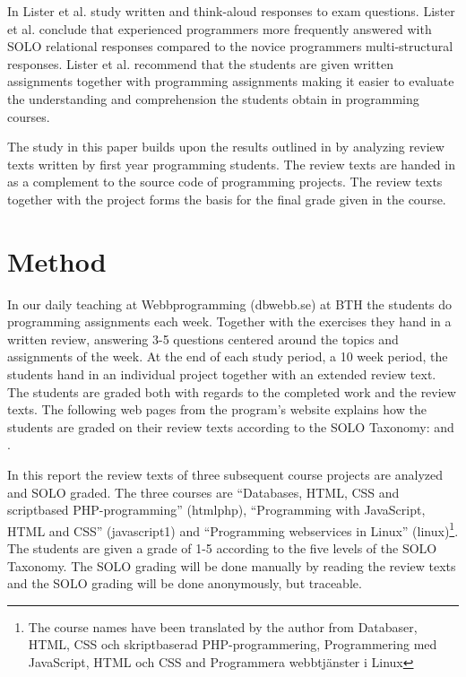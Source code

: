 \documentclass[twoside,twocolumn,a4paper,11pt,english]{article}
\begin{document}
In \cite{lister2006not} Lister et al. study written and think-aloud responses to exam questions. Lister et al. conclude that experienced programmers more frequently answered with SOLO relational responses compared to the novice programmers multi-structural responses. Lister et al. recommend that the students are given written assignments together with programming assignments making it easier to evaluate the understanding and comprehension the students obtain in programming courses.

The study in this paper builds upon the results outlined in \cite{lister2006not} by analyzing review texts written by first year programming students. The review texts are handed in as a complement to the source code of programming projects. The review texts together with the project forms the basis for the final grade given in the course.




\section{Method}

In our daily teaching at Webbprogramming (dbwebb.se) at BTH the students do programming assignments each week. Together with the exercises they hand in a written review, answering 3-5 questions centered around the topics and assignments of the week. At the end of each study period, a 10 week period, the students hand in an individual project together with an extended review text. The students are graded both with regards to the completed work and the review texts. The following web pages from the program's website explains how the students are graded on their review texts according to the SOLO Taxonomy: \cite{redovisning} and \cite{solo}.


In this report the review texts of three subsequent course projects are analyzed and SOLO graded. The three courses are ``Databases, HTML, CSS and scriptbased PHP-programming'' (htmlphp), ``Programming with JavaScript, HTML and CSS'' (javascript1) and ``Programming webservices in Linux'' (linux)\footnote{The course names have been translated by the author from Databaser, HTML, CSS och skriptbaserad PHP-programmering, Programmering med JavaScript, HTML och CSS and Programmera webbtjänster i Linux}. The students are given a grade of 1-5 according to the five levels of the SOLO Taxonomy. The SOLO grading will be done manually by reading the review texts and the SOLO grading will be done anonymously, but traceable.
\end{document}

